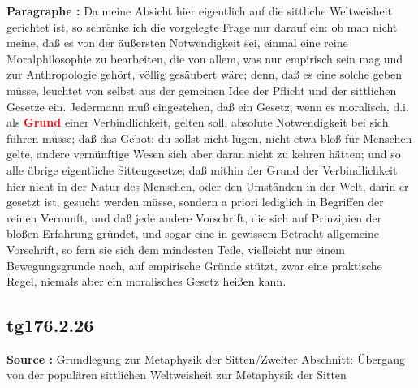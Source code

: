 \documentclass[a4paper,12pt,twoside]{book}
\newcommand{\match}[1]{\textcolor{red}{\textbf{#1}}}
\begin{document}
	\noindent\textbf{Paragraphe : }Da meine Absicht hier eigentlich auf die sittliche Weltweisheit gerichtet ist, so schränke ich die vorgelegte Frage nur darauf ein: ob man nicht meine, daß es von der äußersten Notwendigkeit sei, einmal eine reine Moralphilosophie zu bearbeiten, die von allem, was nur empirisch sein mag und zur Anthropologie gehört, völlig gesäubert wäre; denn, daß es eine solche geben müsse, leuchtet von selbst aus der gemeinen Idee der Pflicht und der sittlichen Gesetze ein. Jedermann muß eingestehen, daß ein Gesetz, wenn es moralisch, d.i. als \match{Grund} einer Verbindlichkeit, gelten soll, absolute Notwendigkeit bei sich führen müsse; daß das Gebot: du sollst nicht lügen, nicht etwa bloß für Menschen gelte, andere vernünftige Wesen sich aber daran nicht zu kehren hätten; und so alle übrige eigentliche Sittengesetze; daß mithin der Grund der Verbindlichkeit hier nicht in der Natur des Menschen, oder den Umständen in der Welt, darin er gesetzt ist, gesucht werden müsse, sondern a priori lediglich in Begriffen der reinen Vernunft, und daß jede andere Vorschrift, die sich auf Prinzipien der bloßen Erfahrung gründet, und sogar eine in gewissem Betracht allgemeine Vorschrift, so fern sie sich dem mindesten Teile, vielleicht nur einem Bewegungsgrunde nach, auf empirische Gründe stützt, zwar eine praktische Regel, niemals aber ein moralisches Gesetz heißen kann. 
	
	\subsection*{tg176.2.26} 
	\textbf{Source : }Grundlegung zur Metaphysik der Sitten/Zweiter Abschnitt: Übergang von der populären sittlichen Weltweisheit zur Metaphysik der Sitten\\  
	
\end{document}
